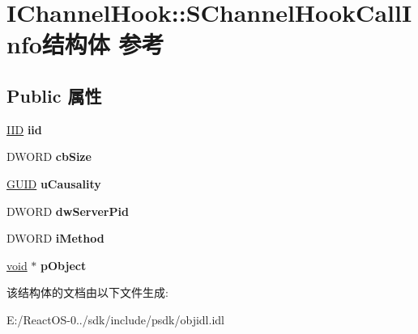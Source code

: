 \hypertarget{struct_i_channel_hook_1_1_s_channel_hook_call_info}{}\section{I\+Channel\+Hook\+:\+:S\+Channel\+Hook\+Call\+Info结构体 参考}
\label{struct_i_channel_hook_1_1_s_channel_hook_call_info}
\subsection*{Public 属性}
\begin{DoxyCompactItemize}
\item 
\mbox{\label{struct_i_channel_hook_1_1_s_channel_hook_call_info_a06a936b9ac64a55435258ae84430f26c}} 
\hyperlink{struct___i_i_d}{I\+ID} {\bfseries iid}
\item 
\mbox{\label{struct_i_channel_hook_1_1_s_channel_hook_call_info_a801c80c5f23ae3dd705c43516a8171c5}} 
D\+W\+O\+RD {\bfseries cb\+Size}
\item 
\mbox{\label{struct_i_channel_hook_1_1_s_channel_hook_call_info_a216bdbad67e076a414c0d85618d848a1}} 
\hyperlink{interface_g_u_i_d}{G\+U\+ID} {\bfseries u\+Causality}
\item 
\mbox{\label{struct_i_channel_hook_1_1_s_channel_hook_call_info_abeac9a557fbe049bb99bc28e08ff6a4b}} 
D\+W\+O\+RD {\bfseries dw\+Server\+Pid}
\item 
\mbox{\label{struct_i_channel_hook_1_1_s_channel_hook_call_info_a72e32be3e6d9f64432b85ffe1ce9bff5}} 
D\+W\+O\+RD {\bfseries i\+Method}
\item 
\mbox{\label{struct_i_channel_hook_1_1_s_channel_hook_call_info_a6a25dd8fd0142f3bc57f0cfd4a99384e}} 
\hyperlink{interfacevoid}{void} $\ast$ {\bfseries p\+Object}
\end{DoxyCompactItemize}


该结构体的文档由以下文件生成\+:\begin{DoxyCompactItemize}
\item 
E\+:/\+React\+O\+S-\/0../sdk/include/psdk/objidl.\+idl\end{DoxyCompactItemize}
